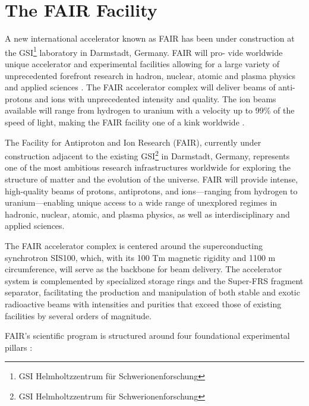 \section{The FAIR Facility}

A new international accelerator known as \gls{FAIR} has been under construction at the GSI\footnote{GSI Helmholtzzentrum für Schwerionenforschung} laboratory in Darmstadt, Germany. FAIR will pro-
vide worldwide unique accelerator and experimental facilities allowing for a large variety of unprecedented forefront research in hadron, nuclear, atomic and plasma physics and applied sciences \cite{123_FAIR}. The FAIR accelerator complex will deliver beams of anti-protons and ions with unprecedented intensity and quality. The ion beams available will range from hydrogen to uranium with a velocity up to 99\% of the speed of light, making the FAIR facility one of a kink worldwide \cite{rosner_future_2007}.




The Facility for Antiproton and Ion Research (FAIR), currently under construction adjacent to the existing GSI\footnote{GSI Helmholtzzentrum für Schwerionenforschung} in Darmstadt, Germany, represents one of the most ambitious research infrastructures worldwide for exploring the structure of matter and the evolution of the universe. FAIR will provide intense, high-quality beams of protons, antiprotons, and ions—ranging from hydrogen to uranium—enabling unique access to a wide range of unexplored regimes in hadronic, nuclear, atomic, and plasma physics, as well as interdisciplinary and applied sciences.

The FAIR accelerator complex is centered around the superconducting synchrotron SIS100, which, with its 100 Tm magnetic rigidity and 1100 m circumference, will serve as the backbone for beam delivery. The accelerator system is complemented by specialized storage rings and the Super-FRS fragment separator, facilitating the production and manipulation of both stable and exotic radioactive beams with intensities and purities that exceed those of existing facilities by several orders of magnitude.

FAIR's scientific program is structured around four foundational experimental pillars \cite{123_FAIR,rosner_future_2007,stoecker_fair_2011}:

